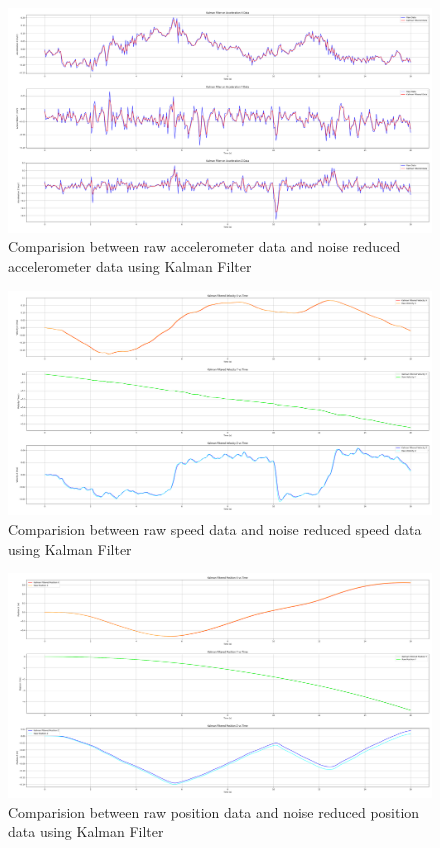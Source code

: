 \documentclass{article}
\begin{document}
\FloatBarrier
\begin{figure}[h]
    \centering
    \includegraphics[height=0.3\textheight]{2_1_8_1.png}
    \caption{Comparision between raw accelerometer data and noise reduced accelerometer data using Kalman Filter}
    \label{fig:accel_kalman}
\end{figure}
\FloatBarrier
\begin{figure}[h]
    \centering
    \includegraphics[height=0.3\textheight]{2_1_8_2.png}
    \caption{Comparision between raw speed data and noise reduced speed data using Kalman Filter}
    \label{fig:speed_kalman}
\end{figure}
\FloatBarrier
\begin{figure}[h]
    \centering
    \includegraphics[height=0.3\textheight]{2_1_8_3.png}
    \caption{Comparision between raw position data and noise reduced position data using Kalman Filter}
    \label{fig:position_kalman}
\end{figure}
\end{document}
